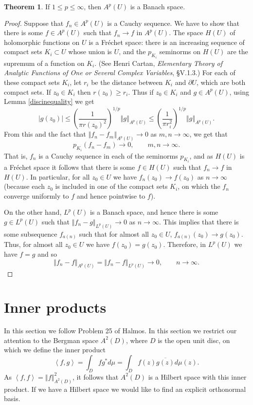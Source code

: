 \documentclass{article}
\newcommand{\inner}[2]{\left\langle #1, #2 \right\rangle}
\newcommand{\norm}[1]{\left\Vert #1 \right\Vert}
\theoremstyle{definition}
\newtheorem{theorem}{Theorem}
\begin{document}
\begin{theorem}
If $1 \leq p \leq \infty$, then $A^p(U)$ is a Banach space.
\label{bergmanbanach}
\end{theorem}
\begin{proof}
Suppose that $f_n \in A^p(U)$ is a Cauchy sequence. We have to show that there is some $f \in A^p(U)$ such that $f_n \to f$ in $A^p(U)$. The space $H(U)$ of holomorphic functions
on $U$ is a Fr\'echet space: there is an increasing sequence of compact sets $K_i \subset U$ whose union is $U$, and the $p_{K_i}$ seminorms on $H(U)$ are the supremum of a function
on $K_i$. (See Henri Cartan, {\em Elementary Theory of Analytic Functions of One or Several Complex Variables}, \S V.1.3.) For each of these compact sets $K_i$, 
let $r_i$ be the distance between $K_i$ and $\partial U$, which are both compact sets. If $z_0 \in K_i$ then
$r(z_0) \geq r_i$. Thus if  $z_0 \in K_i$ and  $g \in A^p(U)$, using Lemma \ref{discinequality} we get
\[
|g(z_0)| \leq \left(\frac{1}{\pi r(z_0)^2}\right)^{1/p} \norm{g}_{A^p(U)} \leq  \left(\frac{1}{\pi r_i^2}\right)^{1/p} \norm{g}_{A^p(U)}.
\]
From this and the fact that $\norm{f_n-f_m}_{A^p(U)} \to 0$ as $m,n \to \infty$, we get that
\[
p_{K_i}(f_n-f_m) \to 0, \qquad m,n \to \infty.
\]
That is, $f_n$ is a Cauchy sequence in each of the seminorms $p_{K_i}$, and as $H(U)$ is a Fr\'echet space it follows that there is some $f \in H(U)$ such that
$f_n \to f$ in $H(U)$. In particular, for all $z_0 \in U$ we have $f_n(z_0) \to f(z_0)$ as $n \to \infty$ (because each $z_0$ is included in one of the compact sets $K_i$, on which
the $f_n$ converge uniformly to $f$ and hence pointwise to $f$).

On the other hand, $L^p(U)$ is a Banach space, and hence there is some $g \in L^p(U)$ such that $\norm{f_n-g}_{L^p(U)} \to 0$ as $n \to \infty$.
This implies that there is some subsequence $f_{a(n)}$ such that 
for almost all $z_0 \in U$, $f_{a(n)}(z_0) \to g(z_0)$. Thus, for almost all $z_0 \in U$ we have $f(z_0)=g(z_0)$. Therefore, in $L^p(U)$ we have $f=g$ and so 
\[
\norm{f_n-f}_{A^p(U)} = \norm{f_n-f}_{L^p(U)} \to 0, \qquad n \to \infty.
\]
\end{proof}



\section{Inner products}
In this section we follow Problem 25 of Halmos.
In this section we restrict our attention to the Bergman space $A^2(D)$, where $D$ is the open unit disc,
on which we define the inner product
\[
\inner{f}{g}=\int_D f g^* d\mu = \int_D f(z) \overline{g(z)} d\mu(z).
\]
As $\inner{f}{f}=\norm{f}_{A^2(D)}^2$, it follows that $A^2(D)$ is a Hilbert space with this inner product. If we have a Hilbert space we would like to find an explicit orthonormal basis.
\end{document}
